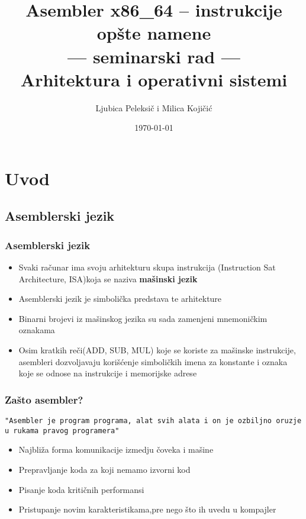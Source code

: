 \documentclass[hyperref={pdfpagelabels=false}]{beamer}
\title{\textbf Asembler x86\_64 -- instrukcije op\v ste namene\\ \small{--- seminarski rad ---  \\Arhitektura i operativni sistemi}}
\author{Ljubica Peleksi\v c i Milica Koji\v ci\' c}
\date{\today}
\begin{document}
	\begin{frame}
		\titlepage
	\end{frame} 

 
\section{Uvod} 
\subsection{Asemblerski jezik}

	\begin{frame}
		\frametitle{Asemblerski jezik} 
		\begin{itemize}
			\pause
			\item Svaki ra\v cunar ima svoju arhitekturu skupa instrukcija (Instruction Sat Architecture,
			ISA)koja se naziva \textbf{ma\v sinski jezik}\pause 
			\item Asemblerski jezik je simboli\v cka predstava te arhitekture\pause
			\item Binarni brojevi iz ma\v sinskog jezika su sada zamenjeni mnemoni\v ckim oznakama\pause
			\item Osim kratkih re\v ci(ADD, SUB, MUL) koje se koriste za ma\v sinske instrukcije, asembleri dozvoljavaju
			kori\v s\' cenje simboli\v ckih imena za konstante i oznaka koje se odnose na
			instrukcije i memorijske adrese
			\end{itemize}
	\end{frame}
	
	\begin{frame}[fragile]
		\frametitle{Za\v sto asembler?} 
			\pause
			\verb|"Asembler je program programa, alat svih alata i on je ozbiljno oruzje u rukama pravog programera"|\pause
		\begin{itemize} 
			\item Najbli\v za forma komunikacije izmedju \v coveka i ma\v sine\pause
			\item Prepravljanje koda za koji nemamo izvorni kod\pause
			\item Pisanje koda kriti\v cnih performansi\pause
			\item Pristupanje novim karakteristikama,pre nego \v sto ih uvedu u kompajler
		\end{itemize}
	\end{frame}

\end{document}
